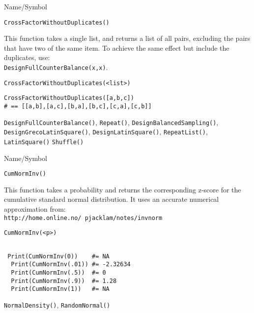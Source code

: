 \rl



\begin{desc}{Name/Symbol}
\item[Name/Symbol]  	\verb+CrossFactorWithoutDuplicates()+

\item[Description] 	This function takes a single list, and returns a list of all 
			pairs, excluding the pairs that have two of the same item. 
			To achieve the same effect but include the duplicates, use: \\
			\verb+DesignFullCounterBalance(x,x)+.

\item[Usage]
\begin{verbatim}
CrossFactorWithoutDuplicates(<list>)
\end{verbatim}

\item[Example]
\begin{verbatim}
CrossFactorWithoutDuplicates([a,b,c]) 
# == [[a,b],[a,c],[b,a],[b,c],[c,a],[c,b]]
\end{verbatim}

\item[See Also] \verb+DesignFullCounterBalance()+, \verb+Repeat()+, \verb+DesignBalancedSampling()+,
 \verb+DesignGrecoLatinSquare()+,
  \verb+DesignLatinSquare()+,  \verb+RepeatList()+, 
  \verb+LatinSquare()+ \verb+Shuffle()+
\end{desc}

\rl
\begin{desc}{Name/Symbol}
\item[Name/Symbol]  	\verb+CumNormInv()+

\item[Description] 	This function takes a probability and returns the 
  corresponding z-score for the cumulative standard normal distribution.
  It uses an accurate numerical approximation from:\\
  \texttt{http://home.online.no/~pjacklam/notes/invnorm}
\item[Usage]
\begin{verbatim}
CumNormInv(<p>)
\end{verbatim}

\item[Example]
\begin{verbatim}

 Print(CumNormInv(0))    #= NA
  Print(CumNormInv(.01)) #= -2.32634
  Print(CumNormInv(.5))  #= 0
  Print(CumNormInv(.9))  #= 1.28
  Print(CumNormInv(1))   #= NA
\end{verbatim}

\item[See Also] \verb+NormalDensity()+, \verb+RandomNormal()+
\end{desc}


